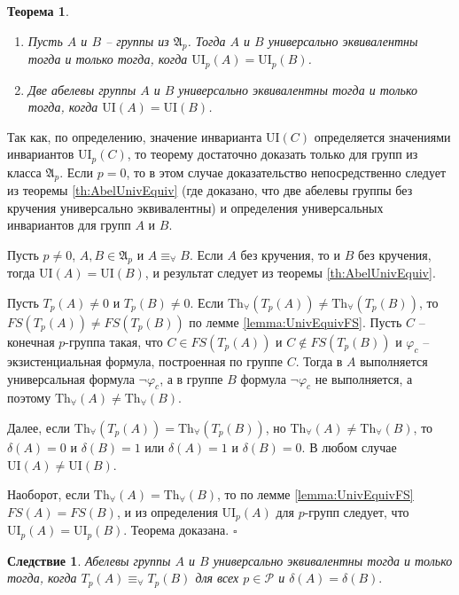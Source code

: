 \documentclass[a4paper,11pt,twoside]{article}
\newtheorem{theorem}{Теорема}[section]
\newtheorem{corollary}{Следствие}[section]
\def\proof{{\noindent{\bf Доказательство.}} }
\def\A{{\mathfrak{A}}}
\def\P{{\mathcal{P}}}
\def\Tha{{\mathrm{Th}_\forall}}
\def\ui{{\mathrm{UI}}}
\begin{document}
\begin{theorem}\label{th:UnivEquivOfGroups}
\begin{enumerate}
\item Пусть $A$ и $B$ -- группы из $\A_p$. Тогда $A$ и $B$ универсально эквивалентны тогда и только тогда, когда $\ui_p(A) = \ui_p(B)$.
\item Две абелевы группы $A$ и $B$ универсально эквивалентны тогда и только тогда, когда $\ui(A) = \ui(B)$.
\end{enumerate}
\end{theorem}


\proof Так как, по определению, значение инварианта $\ui(C)$ определяется значениями инвариантов $\ui_p(C)$, то теорему достаточно доказать только для групп из класса $\A_p$. Если $p=0$, то в этом случае доказательство непосредственно следует из теоремы \ref{th:AbelUnivEquiv} (где доказано, что две абелевы группы без кручения универсально эквивалентны) и определения универсальных инвариантов для групп $A$ и $B$.

Пусть $p \neq 0$, $A, B \in \A_p$ и $A \equiv_\forall B$. Если $A$ без кручения, то и $B$ без кручения, тогда $\ui(A) = \ui(B)$, и результат следует из теоремы \ref{th:AbelUnivEquiv}.

Пусть $T_p(A) \neq 0$ и $T_p(B) \neq 0$. Если $\Tha(T_p(A)) \neq \Tha(T_p(B))$, то $FS(T_p(A)) \neq FS(T_p(B))$ по лемме \ref{lemma:UnivEquivFS}. Пусть $C$ -- конечная $p$-группа такая, что $C \in FS(T_p(A))$ и $C \notin FS(T_p(B))$ и $\varphi_c$ -- экзистенциальная формула, построенная по группе $C$. Тогда в $A$ выполняется универсальная формула $\neg \varphi_c$, а в группе $B$ формула $\neg \varphi_c$ не выполняется, а поэтому $\Tha(A) \neq \Tha(B)$.

Далее, если $\Tha(T_p(A)) = \Tha(T_p(B))$, но $\Tha(A) \neq \Tha(B)$, то $\delta(A) = 0$ и $\delta(B) = 1$ или $\delta(A) = 1$ и $\delta(B) = 0$. В любом случае $\ui(A) \neq \ui(B)$. 

Наоборот, если $\Tha(A) = \Tha(B)$, то по лемме \ref{lemma:UnivEquivFS} $FS(A) = FS(B)$, и из определения $\ui_p(A)$ для $p$-групп следует, что $\ui_p(A) = \ui_p(B)$. Теорема доказана. $\square$

\begin{corollary}\label{cor:UnivEquivTpA_TpB}
Абелевы группы $A$ и $B$ универсально эквивалентны тогда и только тогда, когда $T_p(A) \equiv_\forall T_p(B)$ для всех $p \in \P$ и $\delta(A) = \delta(B).$
\end{corollary}
\end{document}
